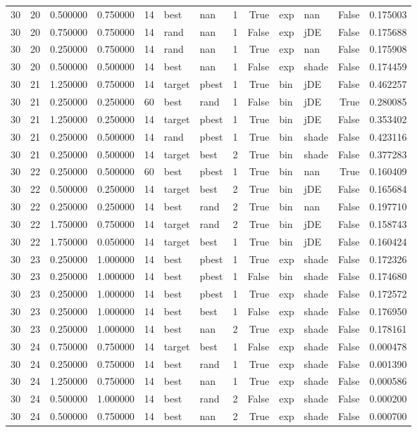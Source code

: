 \begin{tabular}{rrrrrllrrllrr}
30 & 20 & 0.500000 & 0.750000 & 14 & best & nan & 1 & True & exp & nan & False & 0.175003 \\
30 & 20 & 0.750000 & 0.750000 & 14 & rand & nan & 1 & False & exp & jDE & False & 0.175688 \\
30 & 20 & 0.250000 & 0.750000 & 14 & rand & nan & 1 & True & exp & nan & False & 0.175908 \\
30 & 20 & 0.500000 & 0.500000 & 14 & best & nan & 1 & False & exp & shade & False & 0.174459 \\
30 & 21 & 1.250000 & 0.750000 & 14 & target & pbest & 1 & True & bin & jDE & False & 0.462257 \\
30 & 21 & 0.250000 & 0.250000 & 60 & best & rand & 1 & False & bin & jDE & True & 0.280085 \\
30 & 21 & 1.250000 & 0.250000 & 14 & target & pbest & 1 & True & bin & jDE & False & 0.353402 \\
30 & 21 & 0.250000 & 0.500000 & 14 & rand & pbest & 1 & True & bin & shade & False & 0.423116 \\
30 & 21 & 0.250000 & 0.500000 & 14 & target & best & 2 & True & bin & shade & False & 0.377283 \\
30 & 22 & 0.250000 & 0.500000 & 60 & best & pbest & 1 & True & bin & nan & True & 0.160409 \\
30 & 22 & 0.500000 & 0.250000 & 14 & target & best & 2 & True & bin & jDE & False & 0.165684 \\
30 & 22 & 0.250000 & 0.250000 & 14 & best & rand & 2 & True & bin & nan & False & 0.197710 \\
30 & 22 & 1.750000 & 0.750000 & 14 & target & rand & 2 & True & bin & jDE & False & 0.158743 \\
30 & 22 & 1.750000 & 0.050000 & 14 & target & best & 1 & True & bin & jDE & False & 0.160424 \\
30 & 23 & 0.250000 & 1.000000 & 14 & best & pbest & 1 & True & exp & shade & False & 0.172326 \\
30 & 23 & 0.250000 & 1.000000 & 14 & best & pbest & 1 & False & bin & shade & False & 0.174680 \\
30 & 23 & 0.250000 & 1.000000 & 14 & best & pbest & 1 & True & exp & shade & False & 0.172572 \\
30 & 23 & 0.250000 & 1.000000 & 14 & best & best & 1 & False & exp & shade & False & 0.176950 \\
30 & 23 & 0.250000 & 1.000000 & 14 & best & nan & 2 & True & exp & shade & False & 0.178161 \\
30 & 24 & 0.750000 & 0.750000 & 14 & target & best & 1 & False & exp & shade & False & 0.000478 \\
30 & 24 & 0.250000 & 0.750000 & 14 & best & rand & 1 & True & exp & shade & False & 0.001390 \\
30 & 24 & 1.250000 & 0.750000 & 14 & best & nan & 1 & True & exp & shade & False & 0.000586 \\
30 & 24 & 0.500000 & 1.000000 & 14 & best & rand & 2 & False & exp & shade & False & 0.000200 \\
30 & 24 & 0.500000 & 0.750000 & 14 & best & nan & 2 & True & exp & shade & False & 0.000700 \\
\bottomrule
\end{tabular}
